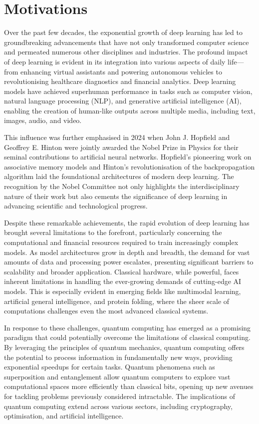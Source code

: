 \section{Motivations}
\label{sec:motivations}
Over the past few decades, the exponential growth of deep learning
has led to groundbreaking advancements that have not only transformed
computer science and permeated numerous other disciplines
and industries. The profound impact of deep learning is evident in
its integration into various aspects of daily life—from enhancing
virtual assistants and powering autonomous vehicles to
revolutionising healthcare diagnostics and financial analytics. Deep
learning models have achieved superhuman performance in tasks such as
computer vision, natural language processing (NLP), and generative
artificial intelligence (AI), enabling the creation of human-like
outputs across multiple media, including text, images, audio, and video.

This influence was further emphasised in 2024 when John J. Hopfield
and Geoffrey E. Hinton were jointly awarded the Nobel Prize in
Physics for their seminal contributions to artificial neural
networks. Hopfield's pioneering work on associative memory models and
Hinton's revolutionisation of the backpropagation algorithm laid the
foundational architectures of modern deep learning. The recognition
by the Nobel Committee not only highlights the interdisciplinary
nature of their work but also cements the significance of deep
learning in advancing scientific and technological progress.

Despite these remarkable achievements, the rapid evolution of deep
learning has brought several limitations to the forefront,
particularly concerning the computational and financial resources
required to train increasingly complex models. As model architectures
grow in depth and breadth, the demand for vast amounts of data and
processing power escalates, presenting significant barriers to
scalability and broader application. Classical hardware, while
powerful, faces inherent limitations in handling the ever-growing
demands of cutting-edge AI models. This is especially evident in
emerging fields like multimodal learning, artificial general
intelligence, and protein folding, where the sheer scale of
computations challenges even the most advanced classical systems.

In response to these challenges, quantum computing has emerged as a
promising paradigm that could potentially overcome the limitations of
classical computing. By leveraging the principles of quantum
mechanics, quantum computing offers the potential to process
information in fundamentally new ways, providing exponential speedups
for certain tasks. Quantum phenomena such as superposition and
entanglement allow quantum computers to explore vast computational
spaces more efficiently than classical bits, opening up new avenues
for tackling problems previously considered intractable. The
implications of quantum computing extend across various sectors,
including cryptography, optimisation, and artificial intelligence.

